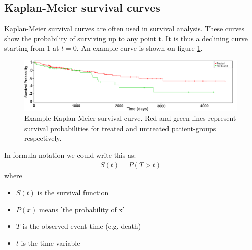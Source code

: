 \subsection{Kaplan-Meier survival curves}
Kaplan-Meier survival curves\cite{goel2010understanding} are often used in survival analysis. These curves show the probability of surviving up to any point t. It is thus a declining curve starting from 1 at $t=0$. An example curve is shown on figure \ref{fig:cox-example-kaplan-meier}.
\begin{figure}
	\centering
	\includegraphics[scale=0.4]{images/example_kaplan_meier_curve}
	\caption{Example Kaplan-Meier survival curve. Red and green lines represent survival probabilities for treated and untreated patient-groups respectively.}
	\label{fig:cox-example-kaplan-meier}
\end{figure}
In formula notation we could write this as:
\begin{equation}
\begin{split}
S(t) = P(T > t)
\end{split}
\end{equation}
where
\begin{itemize}
	\item $S(t)$ is the survival function
	\item $P(x)$ means 'the probability of x'
	\item $T$ is the observed event time (e.g. death)
	\item $t$ is the time variable
\end{itemize}

